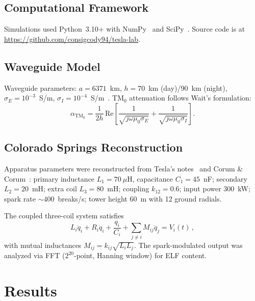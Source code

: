 \documentclass[12pt,preprint,amsmath,amssymb]{revtex4-2}
\begin{document}
\subsection{Computational Framework}

Simulations used Python~3.10+ with NumPy~\cite{harris2020} and SciPy~\cite{virtanen2020}. Source code
is at \url{https://github.com/consigcody94/tesla-lab}.

\subsection{Waveguide Model}

Waveguide parameters: $a = 6371$~km, $h = 70$~km (day)/90~km (night), $\sigma_E = 10^{-3}$~S/m,
$\sigma_I = 10^{-4}$~S/m~\cite{wait1962,galejs1972,mushtak2002}. TM$_0$ attenuation follows Wait's
formulation:
\begin{equation}
  \alpha_{\text{TM}_0} = \frac{1}{2h}\,\text{Re}\!\left[
    \frac{1}{\sqrt{j\omega\mu_0\sigma_E}} +
    \frac{1}{\sqrt{j\omega\mu_0\sigma_I}}
  \right].
  \label{eq:atten}
\end{equation}

\subsection{Colorado Springs Reconstruction}

Apparatus parameters were reconstructed from Tesla's notes~\cite{tesla1978} and Corum \&
Corum~\cite{corum2001}: primary inductance $L_1 = 70~\mu$H, capacitance $C_1 = 45$~nF; secondary
$L_2 = 20$~mH; extra coil $L_3 = 80$~mH; coupling $k_{12} = 0.6$; input power 300~kW; spark rate
${\sim}400$~breaks/s; tower height 60~m with 12 ground radials.

The coupled three-coil system satisfies
\begin{equation}
  L_i\ddot{q}_i + R_i\dot{q}_i + \frac{q_i}{C_i}
    + \sum_{j\neq i}M_{ij}\ddot{q}_j = V_i(t)\,,
  \label{eq:coupled}
\end{equation}
with mutual inductances $M_{ij} = k_{ij}\sqrt{L_iL_j}$. The spark-modulated output was analyzed via
FFT ($2^{20}$-point, Hanning window) for ELF content.

\section{Results}
\label{sec:results}
\end{document}
